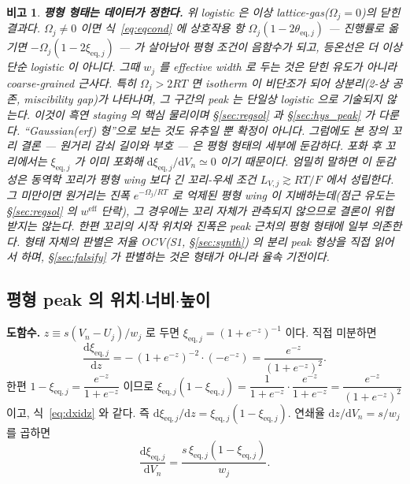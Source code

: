 \documentclass[11pt,a4paper]{article}
\newtheorem*{flagbox}{비고}
\newcommand{\dd}{\mathrm{d}}
\newcommand{\eff}{\mathrm{eff}}
\newcommand{\eq}{\mathrm{eq}}
\begin{document}
\begin{flagbox}
\textbf{평형 \emph{형태}는 데이터가 정한다.} 위 logistic 은 이상 lattice-gas($\Omega_j=0$)의 닫힌 결과다.
$\Omega_j\ne0$ 이면 식~\eqref{eq:eqcond} 에 상호작용 항 $\Omega_j(1-2\theta_{\eq,j})$ — 진행률로 옮기면
$-\Omega_j(1-2\xi_{\eq,j})$ — 가 살아남아 평형 조건이 음함수가 되고, 등온선은 더 이상 단순 logistic 이 아니다.
그때 $w_j$ 를 effective width 로 두는 것은 닫힌 유도가 아니라 coarse-grained 근사다. 특히 $\Omega_j>2RT$ 면
isotherm 이 비단조가 되어 상분리(2-상 공존, miscibility gap)가 나타나며, 그 구간의 peak 는 단일상 logistic 으로
기술되지 않는다. 이것이 흑연 staging 의 핵심 물리이며 \S\ref{sec:regsol} 과 \S\ref{sec:hys_peak} 가 다룬다.
``Gaussian(erf) 형''으로 보는 것도 유추일 뿐 확정이 아니다. 그럼에도 본 장의 꼬리 결론 — 원거리 감쇠 길이와 부호 —
은 평형 형태의 세부에 둔감하다. 포화 후 꼬리에서는 $\xi_{\eq,j}$ 가 이미 포화해 $\dd\xi_{\eq,j}/\dd V_n\simeq0$
이기 때문이다. 엄밀히 말하면 이 둔감성은 동역학 꼬리가 평형 wing 보다 긴 꼬리-우세 조건 $L_{V,j}\gtrsim RT/F$
에서 성립한다. 그 미만이면 원거리는 진폭 $e^{-\Omega_j/RT}$ 로 억제된 평형 wing 이 지배하는데(점근 유도는
\S\ref{sec:regsol} 의 $w^\eff$ 단락), 그 경우에는 꼬리 자체가 관측되지 않으므로 결론이 위협받지는 않는다. 한편
꼬리의 시작 위치와 진폭은 peak 근처의 평형 형태에 일부 의존한다. 형태 자체의 판별은 저율 OCV(S1, \S\ref{sec:synth})
의 분리 peak 형상을 직접 읽어서 하며, \S\ref{sec:falsify} 가 판별하는 것은 형태가 아니라 율속 기전이다.
\end{flagbox}

\subsection{평형 peak 의 위치$\cdot$너비$\cdot$높이}
\textbf{도함수.} $z\equiv s(V_n-U_j)/w_j$ 로 두면 $\xi_{\eq,j}=(1+e^{-z})^{-1}$ 이다. 직접 미분하면
\begin{equation}
\frac{\dd\xi_{\eq,j}}{\dd z}=-\,(1+e^{-z})^{-2}\cdot(-e^{-z})=\frac{e^{-z}}{(1+e^{-z})^2}.
\label{eq:dxidz}
\end{equation}
한편 $1-\xi_{\eq,j}=\dfrac{e^{-z}}{1+e^{-z}}$ 이므로 $\xi_{\eq,j}(1-\xi_{\eq,j})=\dfrac{1}{1+e^{-z}}\cdot
\dfrac{e^{-z}}{1+e^{-z}}=\dfrac{e^{-z}}{(1+e^{-z})^2}$ 이고, 식~\eqref{eq:dxidz} 와 같다. 즉
$\dd\xi_{\eq,j}/\dd z=\xi_{\eq,j}(1-\xi_{\eq,j})$. 연쇄율 $\dd z/\dd V_n=s/w_j$ 를 곱하면
\begin{equation}
\frac{\dd\xi_{\eq,j}}{\dd V_n}=\frac{s\,\xi_{\eq,j}(1-\xi_{\eq,j})}{w_j}.
\label{eq:dxidV}
\end{equation}
\end{document}
